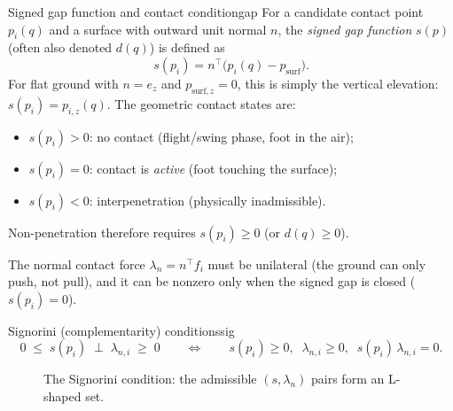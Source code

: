 \documentclass[11pt,a4paper]{article}
\begin{document}
\begin{definition}{Signed gap function and contact condition}{gap}
For a candidate contact point $p_i(q)$ and a surface with outward unit normal $n$, the
\emph{signed gap function} $s(p)$ (often also denoted $d(q)$) is defined as
\begin{equation}\label{eq:signed_gap}
  s(p_i) = n^{\top}\big(p_i(q)-p_{\text{surf}}\big).
\end{equation}
For flat ground with $n=e_z$ and $p_{\text{surf},z}=0$, this is simply the vertical elevation:
$s(p_i)=p_{i,z}(q)$.
The geometric contact states are:
\begin{itemize}[nosep]
  \item $s(p_i) > 0$: no contact (flight/swing phase, foot in the air);
  \item $s(p_i) = 0$: contact is \emph{active} (foot touching the surface);
  \item $s(p_i) < 0$: interpenetration (physically inadmissible).
\end{itemize}
Non-penetration therefore requires $s(p_i) \ge 0$ (or $d(q) \ge 0$).
\end{definition}

The normal contact force $\lambda_n=n^\top f_i$ must be unilateral (the ground can only push,
not pull), and it can be nonzero only when the signed gap is closed ($s(p_i)=0$).

\begin{definition}{Signorini (complementarity) conditions}{sig}
\begin{equation}\label{eq:sig}
  0\;\le\;s(p_i)\;\perp\;\lambda_{n,i}\;\ge\;0
  \qquad\Longleftrightarrow\qquad
  s(p_i)\ge0,\;\; \lambda_{n,i}\ge0,\;\; s(p_i)\,\lambda_{n,i}=0 .
\end{equation}
\end{definition}

\begin{figure}[ht]
\centering
{}
\caption{The Signorini condition: the admissible $(s,\lambda_n)$ pairs form an L-shaped set.}
\end{figure}
\end{document}
